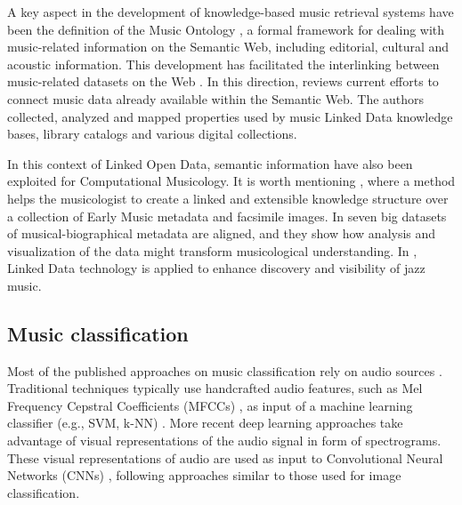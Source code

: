 A key aspect in the development of knowledge-based music retrieval systems have been the definition of the Music Ontology \cite{raimond2007music}, a formal framework for dealing with music-related information on the Semantic Web, including editorial, cultural and acoustic information. This development has facilitated the interlinking between music-related datasets on the Web \cite{raimond2008automatic}. In this direction, \cite{Gracy2013} reviews current efforts to connect music data already available within the Semantic Web. The authors collected, analyzed and mapped properties used by music Linked Data knowledge bases, library catalogs and various digital collections.

In this context of Linked Open Data, semantic information have also been exploited for Computational Musicology. It is worth mentioning \cite{Crawford}, where a method helps the musicologist to create a linked and extensible knowledge structure over a collection of Early Music metadata and facsimile images.  
In \cite{Rose2014} seven big datasets of musical-biographical metadata are aligned, and they show how analysis and visualization of the data might transform musicological understanding. In \cite{Pattuelli2013}, Linked Data technology is applied to enhance discovery and visibility of jazz music.


\subsection{Music classification}
\label{sec:SOA:mir:classfication}


Most of the published approaches on music classification rely on audio sources \citep{sturm2012survey,bogdanov2016cross}. 
Traditional techniques typically use handcrafted audio features, such as Mel Frequency Cepstral Coefficients (MFCCs) \citep{logan2000mel}, as input of a machine learning classifier (e.g., SVM, k-NN) \citep{Tzanetakis2002,seyerlehner2010using}.
More recent deep learning approaches take advantage of visual representations of the audio signal in form of spectrograms.
These visual representations of audio are used as input to Convolutional Neural Networks (CNNs) \citep{dieleman2011audio,dieleman2014end,pons2016experimenting,Choi2016,choi2016convolutional}, following approaches similar to those used for image classification.

